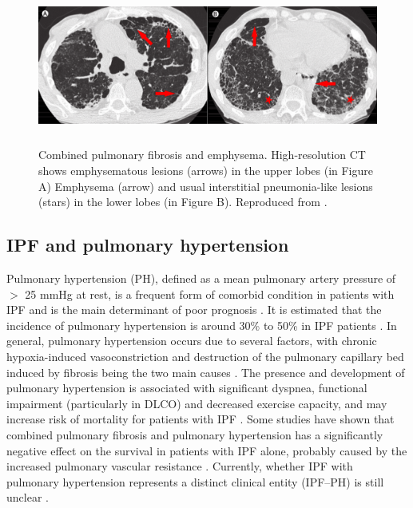 \begin{figure}[htbp]
  \centering 
  \includegraphics[height=2.05in]{Background/Image/CPFEImaging.png}
  \caption{ Combined pulmonary fibrosis and emphysema. High-resolution CT shows emphysematous lesions (arrows) in the upper lobes (in Figure A) Emphysema (arrow) and usual interstitial pneumonia-like lesions (stars) in the lower lobes (in Figure B). Reproduced from \citep{king2011idiopathic}.}
  \label{fig:CPFEImaging}
\end{figure}

\subsection{IPF and pulmonary hypertension}
Pulmonary hypertension (PH), defined as a mean pulmonary artery pressure of $>$ 25 mmHg at rest, is a frequent form of comorbid condition in patients with IPF and is the main determinant of poor prognosis \citep{raghu2011official, xaubet2017idiopathic}. It is estimated that the incidence of pulmonary hypertension is around 30\% to 50\% in IPF patients \citep{king2017idiopathic}. In general, pulmonary hypertension occurs due to several factors, with chronic hypoxia-induced vasoconstriction and destruction of the pulmonary capillary bed induced by fibrosis being the two main causes \citep{hayes2016influence}. The presence and development of pulmonary hypertension is associated with significant dyspnea, functional impairment (particularly in DLCO) and decreased exercise capacity, and may increase risk of mortality for patients with IPF \citep{mejia2009idiopathic,lettieri2006prevalence,nadrous2005impact}. Some studies have shown that combined pulmonary fibrosis and pulmonary hypertension has a significantly negative effect on the survival in patients with IPF alone, probably caused by the increased pulmonary vascular resistance \citep{raghu2011official, king2011idiopathic}. Currently, whether IPF with pulmonary hypertension represents a distinct  clinical entity (IPF–PH) is still unclear \citep{raghu2011official}.

